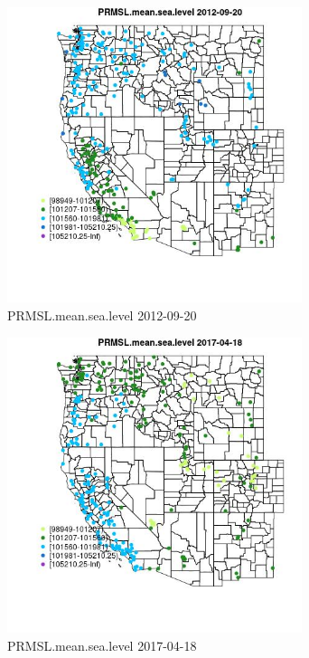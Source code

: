 \begin{figure} 
\centering  
\includegraphics[width=0.77\textwidth]{Code_Outputs/Report_ML_input_PM25_Step4_part_e_de_duplicated_aves_compiled_2019-05-14wNAs_MapObsPRMSLmeansealevel2012-09-20.jpg} 
\caption{\label{fig:Report_ML_input_PM25_Step4_part_e_de_duplicated_aves_compiled_2019-05-14wNAsMapObsPRMSLmeansealevel2012-09-20}PRMSL.mean.sea.level 2012-09-20} 
\end{figure} 
 

\begin{figure} 
\centering  
\includegraphics[width=0.77\textwidth]{Code_Outputs/Report_ML_input_PM25_Step4_part_e_de_duplicated_aves_compiled_2019-05-14wNAs_MapObsPRMSLmeansealevel2017-04-18.jpg} 
\caption{\label{fig:Report_ML_input_PM25_Step4_part_e_de_duplicated_aves_compiled_2019-05-14wNAsMapObsPRMSLmeansealevel2017-04-18}PRMSL.mean.sea.level 2017-04-18} 
\end{figure} 
 

